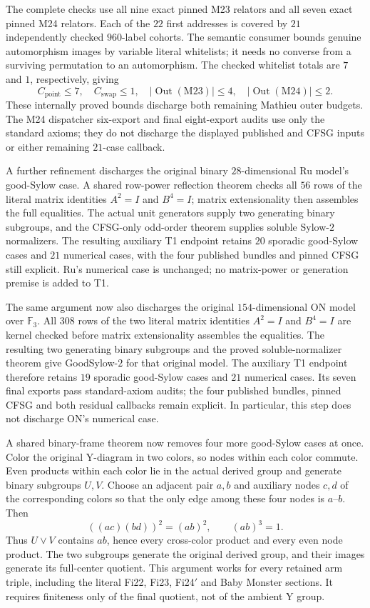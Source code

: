 The complete checks use all nine exact pinned M23 relators and all seven
exact pinned M24 relators. Each of the $22$ first addresses is covered
by $21$ independently checked $960$-label cohorts. The semantic consumer
bounds genuine automorphism images by variable literal whitelists; it
needs no converse from a surviving permutation to an automorphism.
The checked whitelist totals are $7$ and $1$, respectively, giving
\[
 C_{\mathrm{point}}\leq7,\quad C_{\mathrm{swap}}\leq1,\quad
 |\operatorname{Out}(\mathrm{M23})|\leq4,\quad
 |\operatorname{Out}(\mathrm{M24})|\leq2.
\]
These internally proved bounds discharge both remaining Mathieu outer
budgets. The M24 dispatcher six-export and final eight-export audits use
only the standard axioms; they do not discharge the displayed published
and CFSG inputs or either remaining $21$-case callback.

A further refinement discharges the original binary $28$-dimensional Ru
model's good-Sylow case. A shared row-power reflection theorem checks all
$56$ rows of the literal matrix identities $A^2=I$ and $B^4=I$; matrix
extensionality then assembles the full equalities. The actual unit
generators supply two generating binary subgroups, and the CFSG-only
odd-order theorem supplies soluble Sylow-$2$ normalizers. The resulting
auxiliary T1 endpoint retains $20$ sporadic good-Sylow cases and $21$
numerical cases, with the four published bundles and pinned CFSG still
explicit. Ru's numerical case is unchanged; no matrix-power or generation
premise is added to T1.

The same argument now also discharges the original $154$-dimensional
ON model over $\mathbb F_3$. All $308$ rows of the two literal matrix
identities $A^2=I$ and $B^4=I$ are kernel checked before matrix
extensionality assembles the equalities. The resulting two generating
binary subgroups and the proved soluble-normalizer theorem give
GoodSylow-$2$ for that original model. The auxiliary T1 endpoint therefore
retains $19$ sporadic good-Sylow cases and $21$ numerical cases. Its seven
final exports pass standard-axiom audits; the four published bundles,
pinned CFSG and both residual callbacks remain explicit. In particular,
this step does not discharge ON's numerical case.

A shared binary-frame theorem now removes four more good-Sylow cases
at once. Color the original Y-diagram in two colors, so nodes within
each color commute. Even products within each color lie in the actual
derived group and generate binary subgroups $U,V$. Choose an adjacent
pair $a,b$ and auxiliary nodes $c,d$ of the corresponding colors so
that the only edge among these four nodes is $a$--$b$. Then
\[
  ((ac)(bd))^2=(ab)^2,\qquad (ab)^3=1.
\]
Thus $U\vee V$ contains $ab$, hence every cross-color product and every
even node product. The two subgroups generate the original derived group,
and their images generate its full-center quotient. This argument works
for every retained arm triple, including the literal Fi22, Fi23, Fi24$'$
and Baby Monster sections. It requires finiteness only of the final
quotient, not of the ambient Y group.

